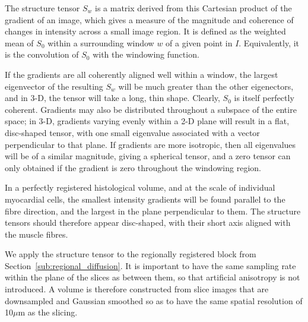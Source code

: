   The structure tensor $S_w$ is a matrix derived from this Cartesian product of the gradient of an image, which gives a measure of the magnitude and coherence of changes in intensity across a small image region. It is defined as the weighted mean of $S_0$ within a surrounding window $w$ of a given point in $I$. Equivalently, it is the convolution of $S_0$ with the windowing function.
  
  If the gradients are all coherently aligned well within a window, the largest eigenvector of the resulting $S_w$ will be much greater than the other eigenectors, and in 3-D, the tensor will take a long, thin shape. Clearly, $S_0$ is itself perfectly coherent. Gradients may also be distributed throughout a subspace of the entire space; in 3-D, gradients varying evenly within a 2-D plane will result in a flat, disc-shaped tensor, with one small eigenvalue associated with a vector perpendicular to that plane. If gradients are more isotropic, then all eigenvalues will be of a similar magnitude, giving a spherical tensor, and a zero tensor can only obtained if the gradient is zero throughout the windowing region.
  
  In a perfectly registered histological volume, and at the scale of individual myocardial cells, the smallest intensity gradients will be found parallel to the fibre direction, and the largest in the plane perpendicular to them. The structure tensors should therefore appear disc-shaped, with their short axis aligned with the muscle fibres.
  
  We apply the structure tensor to the regionally registered block from Section~\ref{sub:regional_diffusion}. It is important to have the same sampling rate within the plane of the slices as between them, so that artificial anisotropy is not introduced. A volume is therefore constructed from slice images that are downsampled and Gaussian smoothed so as to have the same spatial resolution of 10$\mu$m as the slicing.


